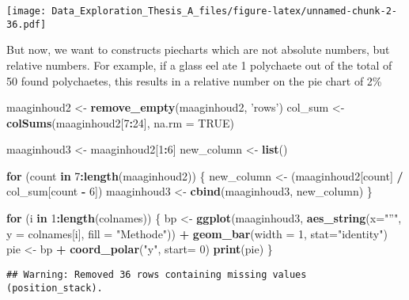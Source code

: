 \documentclass[]{article}
\newenvironment{Shaded}{\begin{snugshade}}{\end{snugshade}}
\newcommand{\KeywordTok}[1]{\textcolor[rgb]{0.13,0.29,0.53}{\textbf{#1}}}
\newcommand{\DataTypeTok}[1]{\textcolor[rgb]{0.13,0.29,0.53}{#1}}
\newcommand{\DecValTok}[1]{\textcolor[rgb]{0.00,0.00,0.81}{#1}}
\newcommand{\StringTok}[1]{\textcolor[rgb]{0.31,0.60,0.02}{#1}}
\newcommand{\OtherTok}[1]{\textcolor[rgb]{0.56,0.35,0.01}{#1}}
\newcommand{\ControlFlowTok}[1]{\textcolor[rgb]{0.13,0.29,0.53}{\textbf{#1}}}
\newcommand{\OperatorTok}[1]{\textcolor[rgb]{0.81,0.36,0.00}{\textbf{#1}}}
\newcommand{\NormalTok}[1]{#1}
\begin{document}
\texttt{[image: Data\_Exploration\_Thesis\_A\_files/figure-latex/unnamed-chunk-2-36.pdf]}

But now, we want to constructs piecharts which are not absolute numbers,
but relative numbers. For example, if a glass eel ate 1 polychaete out
of the total of 50 found polychaetes, this results in a relative number
on the pie chart of 2\%

\begin{Shaded}
\begin{Highlighting}[]
\NormalTok{maaginhoud2 <-}\StringTok{ }\KeywordTok{remove_empty}\NormalTok{(maaginhoud2, }\StringTok{'rows'}\NormalTok{)}
\NormalTok{col_sum <-}\StringTok{ }\KeywordTok{colSums}\NormalTok{(maaginhoud2[}\DecValTok{7}\OperatorTok{:}\DecValTok{24}\NormalTok{], }\DataTypeTok{na.rm =} \OtherTok{TRUE}\NormalTok{)}

\NormalTok{maaginhoud3 <-}\StringTok{ }\NormalTok{maaginhoud2[}\DecValTok{1}\OperatorTok{:}\DecValTok{6}\NormalTok{]}
\NormalTok{new_column <-}\StringTok{ }\KeywordTok{list}\NormalTok{()}

\ControlFlowTok{for}\NormalTok{ (count }\ControlFlowTok{in} \DecValTok{7}\OperatorTok{:}\KeywordTok{length}\NormalTok{(maaginhoud2)) \{}
\NormalTok{  new_column <-}\StringTok{ }\NormalTok{(maaginhoud2[count] }\OperatorTok{/}\StringTok{ }\NormalTok{col_sum[count }\OperatorTok{-}\StringTok{ }\DecValTok{6}\NormalTok{])}
\NormalTok{  maaginhoud3 <-}\StringTok{ }\KeywordTok{cbind}\NormalTok{(maaginhoud3, new_column)}
\NormalTok{\}}

\ControlFlowTok{for}\NormalTok{ (i }\ControlFlowTok{in} \DecValTok{1}\OperatorTok{:}\KeywordTok{length}\NormalTok{(colnames)) \{}
\NormalTok{  bp <-}\StringTok{ }\KeywordTok{ggplot}\NormalTok{(maaginhoud3, }\KeywordTok{aes_string}\NormalTok{(}\DataTypeTok{x=}\StringTok{"''"}\NormalTok{, }\DataTypeTok{y =}\NormalTok{ colnames[i], }\DataTypeTok{fill =} \StringTok{"Methode"}\NormalTok{)) }\OperatorTok{+}
\StringTok{    }\KeywordTok{geom_bar}\NormalTok{(}\DataTypeTok{width =} \DecValTok{1}\NormalTok{, }\DataTypeTok{stat=}\StringTok{"identity"}\NormalTok{)}
\NormalTok{  pie <-}\StringTok{ }\NormalTok{bp }\OperatorTok{+}\StringTok{ }\KeywordTok{coord_polar}\NormalTok{(}\StringTok{"y"}\NormalTok{, }\DataTypeTok{start=} \DecValTok{0}\NormalTok{)}
  \KeywordTok{print}\NormalTok{(pie)}
\NormalTok{\}}
\end{Highlighting}
\end{Shaded}

\begin{verbatim}
## Warning: Removed 36 rows containing missing values (position_stack).
\end{verbatim}
\end{document}
